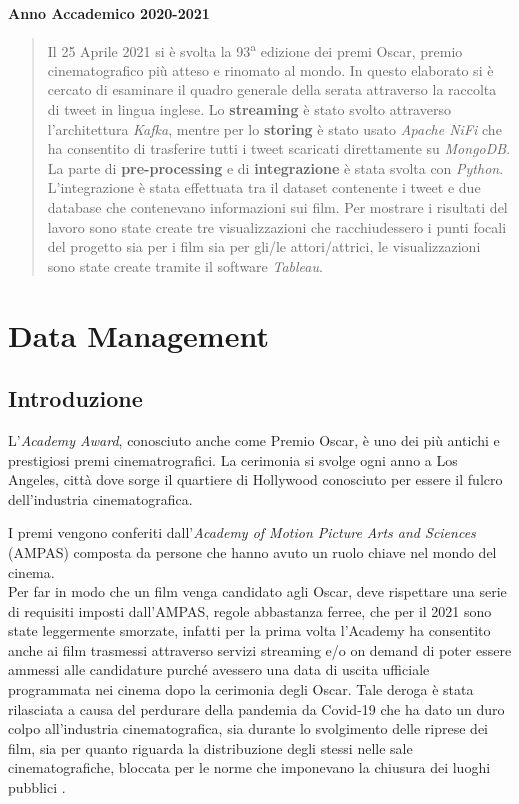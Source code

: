 \documentclass[11pt,a4paper]{report}
\begin{document}
	
	\vfill
	\par
	\begin{center}
		{\large \textbf{Anno Accademico 2020-2021}}
	\end{center}
	
	

\begin{abstract}
Il 25 Aprile 2021 si è svolta la 93\textsuperscript{a} edizione dei premi Oscar, premio cinematografico più atteso e rinomato al mondo.
In questo elaborato si è cercato di esaminare il quadro generale della serata attraverso la raccolta di tweet in lingua inglese.
Lo \textbf{streaming} è stato svolto attraverso l'architettura \textit{Kafka}, mentre per lo \textbf{storing} è stato usato \textit{Apache NiFi} che ha consentito di trasferire tutti i tweet scaricati direttamente su \textit{MongoDB}.
La parte di \textbf{pre-processing} e di \textbf{integrazione} è stata svolta con \textit{Python}. L'integrazione è stata effettuata tra il dataset contenente i tweet e due database che contenevano informazioni sui film.
Per mostrare  i risultati del lavoro sono state create tre visualizzazioni che racchiudessero i punti focali del progetto sia per i film sia per gli/le attori/attrici, le visualizzazioni sono state create tramite il software \textit{Tableau}.
\end{abstract}
	\tableofcontents
	\cleardoublepage


\part{Data Management}



\chapter{Introduzione}
L'\textit{Academy Award}, conosciuto anche come Premio Oscar, è uno dei più antichi e prestigiosi premi cinematrografici. La cerimonia si svolge ogni anno a Los Angeles, città dove sorge il quartiere di Hollywood conosciuto per essere il fulcro dell'industria cinematografica.

I premi vengono conferiti dall'\textit{Academy of Motion Picture Arts and Sciences} (AMPAS) composta da persone che hanno avuto un ruolo chiave nel mondo del cinema.\\Per far in modo che un film venga candidato agli Oscar, deve rispettare una serie di requisiti imposti dall'AMPAS, regole abbastanza ferree, che per il 2021 sono state leggermente smorzate, infatti per la prima volta l'Academy ha consentito anche ai film trasmessi attraverso servizi streaming e/o on demand di poter essere ammessi alle candidature purché avessero una data di uscita ufficiale programmata nei cinema dopo la cerimonia degli Oscar. Tale deroga è stata rilasciata a causa del perdurare della pandemia da Covid-19 che ha dato un duro colpo all'industria cinematografica, sia durante lo svolgimento delle riprese dei film, sia per quanto riguarda la distribuzione degli stessi nelle sale cinematografiche, bloccata per le norme che imponevano la chiusura dei luoghi pubblici \cite{noauthor_academy_2021} \cite{noauthor_oscarsorg_nodate}.
\end{document}
